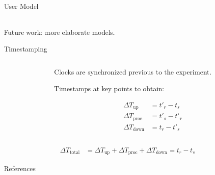 \documentclass[aspectratio=1610, notes]{beamer}
\begin{document}
\begin{frame}{User Model}
    \begin{center}
        \\
        \vspace{.1\textheight}%
        Future work: more elaborate models.
    \end{center}
\end{frame}

\begin{frame}{Timestamping}
    \begin{columns}[onlytextwidth]
        \begin{column}{.5\linewidth}
            \footnotesize%
            \raggedright%
            
        \end{column}%
        \begin{column}{.5\linewidth}
            Clocks are synchronized previous to the experiment.

            \vspace{\baselineskip}%
            Timestamps at key points to obtain:

            \begin{align}
                {\Delta}T_\text{up}   & = t'_{r} - t_{s}  \\
                {\Delta}T_\text{proc} & = t'_{s} - t'_{r} \\
                {\Delta}T_\text{down} & = t_{r} - t'_{s}
            \end{align}
        \end{column}%
    \end{columns}
    \begin{align}
        {\Delta}T_\text{total} & = {\Delta}T_\text{up} + {\Delta}T_\text{proc} + {\Delta}T_\text{down} = t_{r} - t_{s}
    \end{align}
\end{frame}

\begin{frame}[allowframebreaks, t]{References}
    \nocite{*}
    \printbibliography%
\end{frame}
\end{document}
